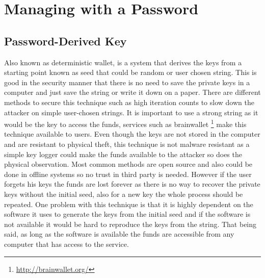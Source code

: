
\section{Managing with a Password}



\subsection{Password-Derived Key} 
Also known as deterministic wallet, is a system that derives the keys from a starting point known as seed that could be random or user chosen string. This is good in the security manner that there is no need to save the private keys in a computer and just save the string or write it down on a paper. There are different methods to secure this technique such as high iteration counts to slow down the attacker on simple user-chosen strings. It is important to use a strong string as it would be the key to access the funds, services such as brainwallet \footnote{\url{http://brainwallet.org/}} make this technique available to users. Even though the keys are not stored in the computer and are resistant to physical theft, this technique is not malware resistant as a simple key logger could make the funds available to the attacker so does the physical observation. Most common methods are open source and also could be done in offline systems so no trust in third party is needed. However if the user forgets his keys the funds are lost forever as there is no way to recover the private keys without the initial seed, also for a new key the whole process should be repeated. One problem with this technique is that it is highly dependent on the software it uses to generate the keys from the initial seed and if the software is not available it would be hard to reproduce the keys from the string. That being said, as long as the software is available the funds are accessible from any computer that has access to the service. 


